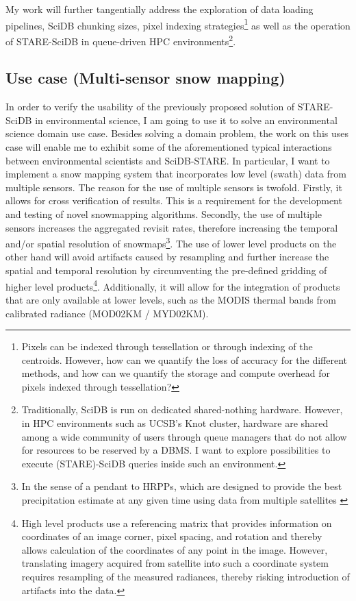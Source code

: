 \documentclass[a4paper,10pt]{article}
\begin{document}
My work will further tangentially address the exploration of data loading pipelines, SciDB chunking sizes, pixel indexing strategies\footnote{Pixels can be indexed through tessellation or through indexing of the centroids. However, how can we quantify the loss of accuracy for the different methods, and how can we quantify the storage and compute overhead for pixels indexed through tessellation?} 
as well as the operation of \gls{STARE}-SciDB in queue-driven \gls{HPC} environments\footnote{Traditionally, SciDB is run on dedicated shared-nothing hardware. However, in \gls{HPC} environments such as UCSB's Knot cluster, hardware are shared among a wide community of users through queue managers that do not allow for resources to be reserved by a DBMS. I want to explore possibilities to execute (\gls{STARE})-SciDB queries inside such an environment.}.

\newpage



\subsection{Use case (Multi-sensor snow mapping)}
In order to verify the usability of the previously proposed solution of STARE-SciDB in environmental science, I am going to use it to solve an environmental science  domain use case. Besides solving a domain problem, the work on this uses case will enable me to exhibit some of the aforementioned typical interactions between environmental scientists and SciDB-STARE.
In particular, I want to implement a snow mapping system that incorporates low level (swath) data from multiple sensors. The reason for the use of multiple sensors is twofold. Firstly, it allows for cross verification of results. This is a requirement for the development and testing of novel snowmapping algorithms. Secondly, the use of multiple sensors increases the aggregated revisit rates, therefore increasing the temporal and/or spatial resolution of snowmaps\footnote{In the sense of a pendant to \glspl{HRPP}, which are designed to provide the best precipitation estimate at any given time using data from multiple satellites \citep{Lettenmaier2015}}.
The use of lower level products on the other hand will avoid artifacts caused by resampling and further increase the spatial and temporal resolution by circumventing the pre-defined gridding of higher level products\footnote{High level products use a referencing matrix that provides information on coordinates of an image corner, pixel spacing, and rotation and thereby allows calculation of the coordinates of any point in the image. However, translating imagery acquired from satellite into such a coordinate system requires resampling of the measured radiances, thereby risking introduction of artifacts into the data.}. Additionally, it will allow for the integration of products that are only available at lower levels, such as the MODIS thermal bands from calibrated radiance (MOD02KM / MYD02KM).
\end{document}
